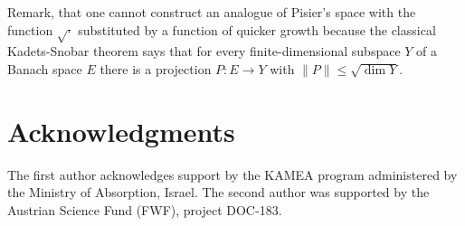 \documentclass[11pt,twoside, reqno]{amsart}
\theoremstyle{plain}
\theoremstyle{remark}
\theoremstyle{definition}
\numberwithin{equation}{section}
\begin{document}
Remark, that one cannot construct an analogue of Pisier's space with the function $\sqrt{\cdot}$ substituted by a function of quicker growth because the classical Kadets-Snobar theorem  \cite[Theorem B]{RKS23} says that for every finite-dimensional subspace $Y$ of a Banach space $E$ there is a projection $P: E \to Y$ with $\|P\| \le \sqrt{\dim Y}$.


\section*{Acknowledgments}

The first author acknowledges support by the KAMEA program administered by the Ministry of Absorption, Israel.
The second author was supported by the Austrian Science Fund (FWF), project DOC-183.
\end{document}
